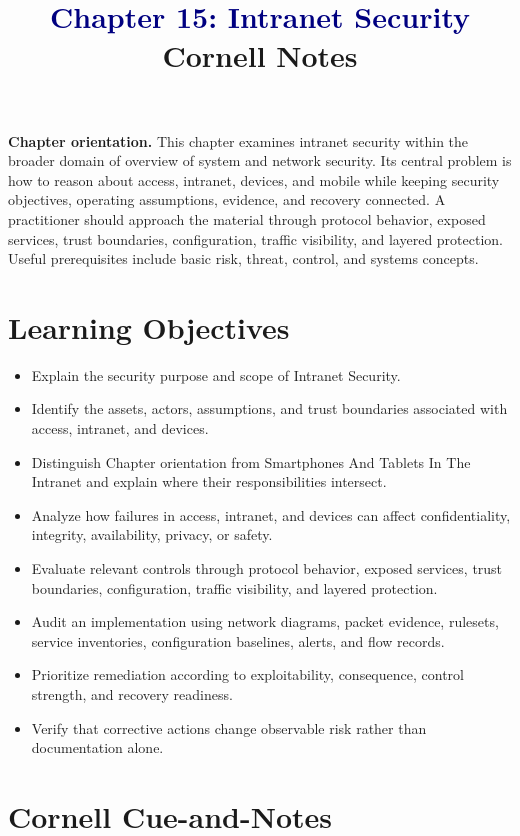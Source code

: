 \documentclass[11pt]{article}
\title{\textcolor{Navy}{Chapter 15: Intranet Security}\\[2mm]\large Cornell Notes}
\author{}
\date{}
\begin{document}
\maketitle
\thispagestyle{fancy}
\vspace{-1.5em}
\begin{orientationbox}
\textbf{Chapter orientation.} This chapter examines intranet security within the broader domain of overview of system and network security. Its central problem is how to reason about access, intranet, devices, and mobile while keeping security objectives, operating assumptions, evidence, and recovery connected. A practitioner should approach the material through protocol behavior, exposed services, trust boundaries, configuration, traffic visibility, and layered protection. Useful prerequisites include basic risk, threat, control, and systems concepts.
\end{orientationbox}
\section*{Learning Objectives}
\begin{itemize}
\item Explain the security purpose and scope of Intranet Security.
\item Identify the assets, actors, assumptions, and trust boundaries associated with access, intranet, and devices.
\item Distinguish Chapter orientation from Smartphones And Tablets In The Intranet and explain where their responsibilities intersect.
\item Analyze how failures in access, intranet, and devices can affect confidentiality, integrity, availability, privacy, or safety.
\item Evaluate relevant controls through protocol behavior, exposed services, trust boundaries, configuration, traffic visibility, and layered protection.
\item Audit an implementation using network diagrams, packet evidence, rulesets, service inventories, configuration baselines, alerts, and flow records.
\item Prioritize remediation according to exploitability, consequence, control strength, and recovery readiness.
\item Verify that corrective actions change observable risk rather than documentation alone.
\end{itemize}
\section*{Cornell Cue-and-Notes}
\end{document}
